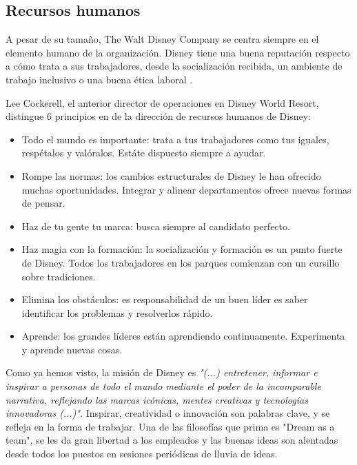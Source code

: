\subsection{Recursos humanos}
A pesar de su tamaño, The Walt Disney Company se centra siempre en el elemento humano de la organización. Disney tiene una buena reputación respecto a cómo trata a sus trabajadores, desde la socialización recibida, un ambiente de trabajo inclusivo  o una buena ética laboral .

Lee Cockerell, el anterior director de operaciones en Disney World Resort, distingue 6 principios en de la dirección de recursos humanos de Disney:
\begin{itemize}
\item Todo el mundo es importante: trata a tus trabajadores como tus iguales, respétalos y valóralos. Estáte dispuesto siempre a ayudar.

\item Rompe las normas: los cambios estructurales de Disney le han ofrecido muchas oportunidades. Integrar y alinear departamentos ofrece nuevas formas de pensar.

\item Haz de tu gente tu marca: busca siempre al candidato perfecto.

\item Haz magia con la formación: la socialización y formación es un punto fuerte de Disney. Todos los trabajadores en los parques comienzan con un cursillo sobre tradiciones.

\item Elimina los obstáculos: es responsabilidad de un buen líder es saber identificar los problemas y resolverlos rápido.

\item Aprende: los grandes líderes están aprendiendo continuamente. Experimenta y aprende nuevas cosas.

\end{itemize}

Como ya hemos visto, la misión de Disney es \textit{"(...) entretener, informar e inspirar a personas de todo el mundo mediante el poder de la incomparable narrativa, reflejando las marcas icónicas, mentes creativas y tecnologías innovadoras (...)"}. Inspirar, creatividad o innovación son palabras clave, y se refleja en la forma de trabajar. Una de las filosofías que prima es "Dream as a team", se les da gran libertad a los empleados y las buenas ideas son alentadas desde todos los puestos en sesiones periódicas de lluvia de ideas.
